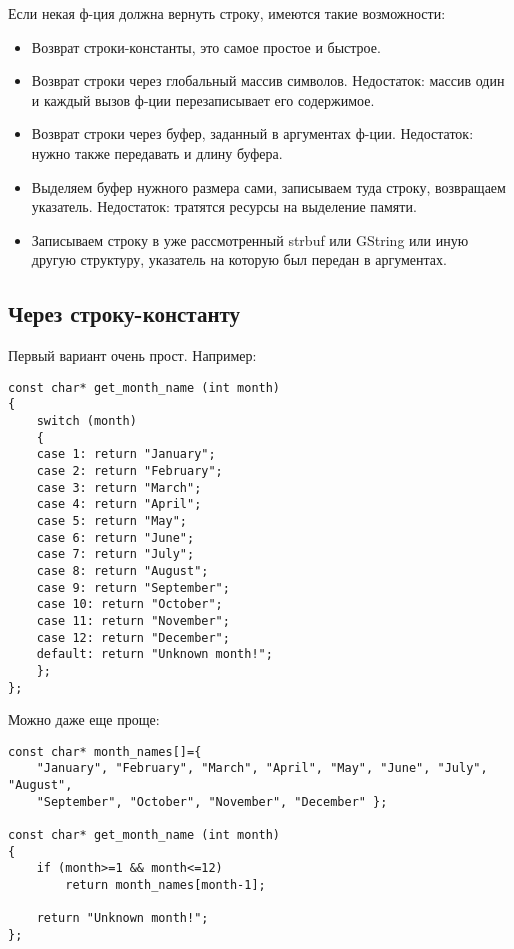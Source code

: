 Если некая ф-ция должна вернуть строку, имеются такие возможности:

\begin{itemize}
\item
Возврат строки-константы, это самое простое и быстрое.

\item
Возврат строки через глобальный массив символов. Недостаток: массив один и каждый вызов ф-ции перезаписывает
его содержимое.

\item
Возврат строки через буфер, заданный в аргументах ф-ции. Недостаток: нужно также передавать и длину буфера.

\item
Выделяем буфер нужного размера сами, записываем туда строку, возвращаем указатель. Недостаток: тратятся ресурсы
на выделение памяти.

\item
Записываем строку в уже рассмотренный strbuf или GString или иную другую структуру, указатель на которую был
передан в аргументах.

\end{itemize}

\subsection{Через строку-константу}

Первый вариант очень прост. Например:

\begin{lstlisting}
const char* get_month_name (int month)
{
	switch (month)
	{
	case 1: return "January";
	case 2: return "February";
	case 3: return "March";
	case 4: return "April";
	case 5: return "May";
	case 6: return "June";
	case 7: return "July";
	case 8: return "August";
	case 9: return "September";
	case 10: return "October";
	case 11: return "November";
	case 12: return "December";
	default: return "Unknown month!";
	};
};
\end{lstlisting}

Можно даже еще проще:

\begin{lstlisting}
const char* month_names[]={
	"January", "February", "March", "April", "May", "June", "July", "August",
	"September", "October", "November", "December" };

const char* get_month_name (int month)
{
	if (month>=1 && month<=12)
		return month_names[month-1];

	return "Unknown month!";
};
\end{lstlisting}

